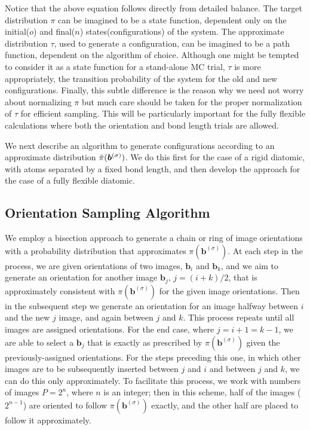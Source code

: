        Notice that the above equation follows directly from detailed balance. The target distribution $\pi$ can be imagined to be a state function, dependent only on the initial($o$) and final($n$) states(configurations) of the system. The approximate distribution $\tau$, used to generate a configuration, can be imagined to be a path function, dependent on the algorithm of choice. Although one might be tempted to consider it as a state function for a stand-alone MC trial, $\tau$ is more appropriately, the transition probability of the system for the old and new configurations. Finally, this subtle difference is the reason why we need not worry about normalizing $\pi$ but much care should be taken for the proper normalization of $\tau$ for efficient sampling. This will be particularly important for the fully flexible calculations where both the orientation and bond length trials are allowed. 

        We next describe an algorithm to generate configurations according to an approximate distribution $\tilde\pi({\boldsymbol {b}}^{(\sigma)})$. We do this first for the case of a rigid diatomic, with atoms separated by a fixed bond length, and then develop the approach for the case of a fully flexible diatomic.
    \subsection{Orientation Sampling Algorithm}
    \label{subsec:orMove}
    We employ a bisection approach to generate a chain or ring of image orientations with a probability distribution that approximates $\pi({\mathbf b}^{(\sigma)})$. At each step in the process, we are given orientations of two images, ${\mathbf b}_i$ and ${\mathbf b}_k$, and we aim to generate an orientation for another image ${\mathbf b}_j$, $j = (i+k)/2$, that is approximately consistent with $\pi({\mathbf b}^{(\sigma)})$ for the given image orientations. Then in the subsequent step we generate an orientation for an image halfway between $i$ and the new $j$ image, and again between $j$ and $k$. This process repeats until all images are assigned orientations. For the end case, where $j = i+1 = k-1$, we are able to select a ${\mathbf b}_j$ that is exactly as prescribed by $\pi({\mathbf b}^{(\sigma)})$ given the previously-assigned orientations. For the steps preceding this one, in which other images are to be subsequently inserted between $j$ and $i$ and between $j$ and $k$, we can do this only approximately. To facilitate this process, we work with numbers of images $P = 2^n$, where $n$ is an integer; then in this scheme, half of the images ($2^{n-1}$) are oriented to follow $\pi({\mathbf b}^{(\sigma)})$ exactly, and the other half are placed to follow it approximately.

